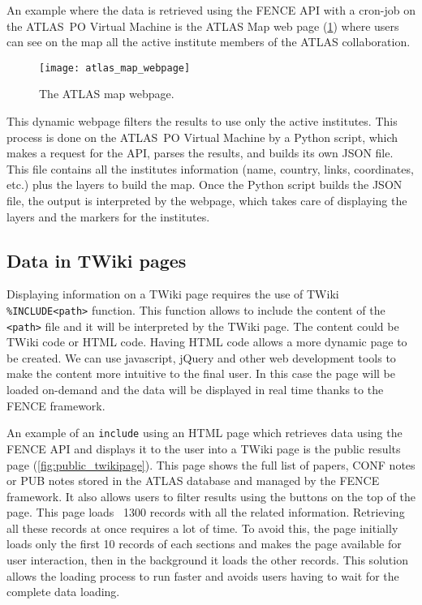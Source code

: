 An example where the data is retrieved using the FENCE API with a cron-job on the ATLAS~PO Virtual Machine is the ATLAS Map web page (\cref{fig:atlas_map_webpage}) where users can see on the map all the active institute members of the ATLAS collaboration.

\begin{figure}[htb]
  \centering
  \texttt{[image: atlas\_map\_webpage]}
  \caption{The ATLAS map webpage.}
  \label{fig:atlas_map_webpage}
\end{figure}

This dynamic webpage filters the results to use only the active institutes.
This process is done on the ATLAS~PO Virtual Machine by a Python script,
which makes a request for the API, parses the results, and builds its own JSON file.
This file contains all the institutes information (name, country, links, coordinates, etc.) plus the layers to build the map.
Once the Python script builds the JSON file, the output is interpreted by the webpage, which takes care of displaying the layers and the markers for the institutes.


\subsection{Data in TWiki pages}
\label{sec:Data_in_twiki_pages}

Displaying information on a TWiki page requires the use of TWiki \texttt{\%INCLUDE<path>} function.
This function allows to include the content of the \texttt{<path>} file and it will be interpreted by the TWiki page.
The content could be TWiki code or HTML code.
Having HTML code allows a more dynamic page to be created.
We can use javascript, jQuery and other web development tools to make the content more intuitive to the final user.
In this case the page will be loaded on-demand and the data will be displayed in real time thanks to the FENCE framework.

An example of an \texttt{include} using an HTML page which retrieves data using the FENCE API and displays it to the user into a TWiki page is the public results page (\cref{fig:public_twikipage}).
This page shows the full list of papers, CONF notes or PUB notes stored in the ATLAS database and managed by the FENCE framework.
It also allows users to filter results using the buttons on the top of the page.
This page loads ~1300 records with all the related information.
Retrieving all these records at once requires a lot of time.
To avoid this, the page initially loads only the first 10 records of each sections and makes the page available for user interaction,
then in the background it loads the other records.
This solution allows the loading process to run faster and avoids users having to wait for the complete data loading.

